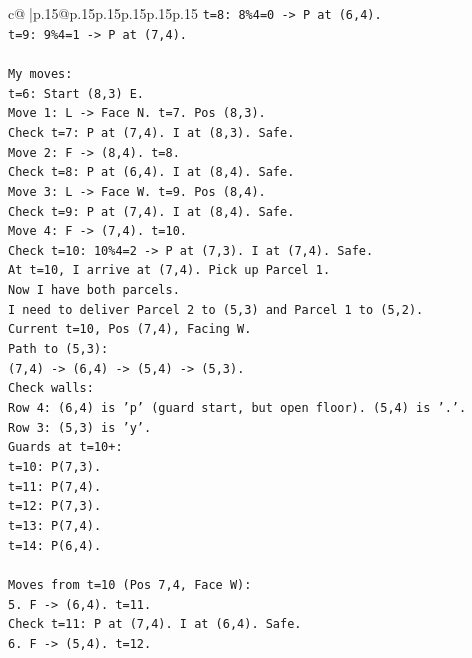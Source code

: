 \documentclass{article}
\begin{document}
{\begin{supertabular}{c@{$\;$}|p{.15\linewidth}@{}p{.15\linewidth}p{.15\linewidth}p{.15\linewidth}p{.15\linewidth}p{.15\linewidth}}
{{{\texttt{t=8: 8\%4=0 {-}> P at (6,4).} \\
\texttt{t=9: 9\%4=1 {-}> P at (7,4).} \\
\\ 
\texttt{My moves:} \\
\texttt{t=6: Start (8,3) E.} \\
\texttt{Move 1: L {-}> Face N. t=7. Pos (8,3).} \\
\texttt{Check t=7: P at (7,4). I at (8,3). Safe.} \\
\texttt{Move 2: F {-}> (8,4). t=8.} \\
\texttt{Check t=8: P at (6,4). I at (8,4). Safe.} \\
\texttt{Move 3: L {-}> Face W. t=9. Pos (8,4).} \\
\texttt{Check t=9: P at (7,4). I at (8,4). Safe.} \\
\texttt{Move 4: F {-}> (7,4). t=10.} \\
\texttt{Check t=10: 10\%4=2 {-}> P at (7,3). I at (7,4). Safe.} \\
\texttt{At t=10, I arrive at (7,4). Pick up Parcel 1.} \\
\texttt{Now I have both parcels.} \\
\texttt{I need to deliver Parcel 2 to (5,3) and Parcel 1 to (5,2).} \\
\texttt{Current t=10, Pos (7,4), Facing W.} \\
\texttt{Path to (5,3):} \\
\texttt{(7,4) {-}> (6,4) {-}> (5,4) {-}> (5,3).} \\
\texttt{Check walls:} \\
\texttt{Row 4: (6,4) is 'p' (guard start, but open floor). (5,4) is '.'.} \\
\texttt{Row 3: (5,3) is 'y'.} \\
\texttt{Guards at t=10+:} \\
\texttt{t=10: P(7,3).} \\
\texttt{t=11: P(7,4).} \\
\texttt{t=12: P(7,3).} \\
\texttt{t=13: P(7,4).} \\
\texttt{t=14: P(6,4).} \\
\\ 
\texttt{Moves from t=10 (Pos 7,4, Face W):} \\
\texttt{5. F {-}> (6,4). t=11.} \\
\texttt{Check t=11: P at (7,4). I at (6,4). Safe.} \\
\texttt{6. F {-}> (5,4). t=12.} \\
}}}
\end{supertabular}}
\end{document}
